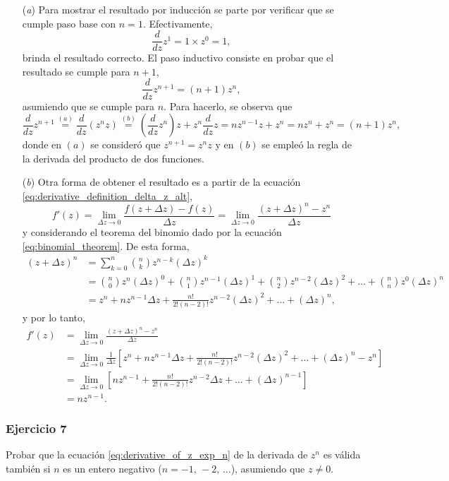 \documentclass[a4paper]{report}
\begin{document}
\begin{enumerate}
 \item[(\textit{a})] Para mostrar el resultado por inducción se parte por verificar que se cumple paso base con \(n=1\). Efectivamente,
 \[
  \frac{d}{dz}z^1=1\times z^0=1,
 \]
 brinda el resultado correcto. El paso inductivo consiste en probar que el resultado se cumple para \(n+1\),
 \[
  \frac{d}{dz}z^{n+1}=(n+1)z^n,
 \]
 asumiendo que se cumple para \(n\). Para hacerlo, se observa que
 \[
  \frac{d}{dz}z^{n+1}\overset{(a)}{=}\frac{d}{dz}(z^nz)\overset{(b)}{=}\left(\frac{d}{dz}z^n\right)z+z^n\frac{d}{dz}z
  =nz^{n-1}z+z^n=nz^n+z^n=(n+1)z^n,
 \]
 donde en \((a)\) se consideró que \(z^{n+1}=z^nz\) y en \((b)\) se empleó la regla de la derivada del producto de dos funciones.
 \item[(\textit{b})] Otra forma de obtener el resultado es a partir de la ecuación \ref{eq:derivative_definition_delta_z_alt},
 \[
  f'(z)=\lim_{\Delta z\to 0}\frac{f(z+\Delta z)-f(z)}{\Delta z}
   =\lim_{\Delta z\to 0}\frac{(z+\Delta z)^n-z^n}{\Delta z}
 \]
 y considerando el teorema del binomio dado por la ecuación \ref{eq:binomial_theorem}.
 De esta forma,
\begin{align*}
 (z+\Delta z)^n&=\sum_{k=0}^n\binom{n}{k}z^{n-k}(\Delta z)^k\\
  &=\binom{n}{0}z^n(\Delta z)^0+\binom{n}{1}z^{n-1}(\Delta z)^1+\binom{n}{2}z^{n-2}(\Delta z)^2+\dots+\binom{n}{n}z^0(\Delta z)^n\\
  &=z^n+nz^{n-1}\Delta z+\frac{n!}{2!(n-2)!}z^{n-2}(\Delta z)^2+\dots+(\Delta z)^n,
\end{align*}
y por lo tanto,
\begin{align*}
 f'(z)&=\lim_{\Delta z\to 0}\frac{(z+\Delta z)^n-z^n}{\Delta z}\\
  &=\lim_{\Delta z\to 0}\frac{1}{\Delta z}\left[z^n+nz^{n-1}\Delta z+\frac{n!}{2!(n-2)!}z^{n-2}(\Delta z)^2+\dots+(\Delta z)^n-z^n\right]\\
  &=\lim_{\Delta z\to 0}\left[nz^{n-1}+\frac{n!}{2!(n-2)!}z^{n-2}\Delta z+\dots+(\Delta z)^{n-1}\right]\\
  &=nz^{n-1}.
\end{align*}
\end{enumerate}
 

\subsubsection{Ejercicio 7} 
 
Probar que la ecuación \ref{eq:derivative_of_z_exp_n} de la derivada de \(z^n\) es válida también si \(n\) es un entero negativo (\(n=-1,\,-2,\,\dots\)), asumiendo que \(z\neq0\).
\end{document}
